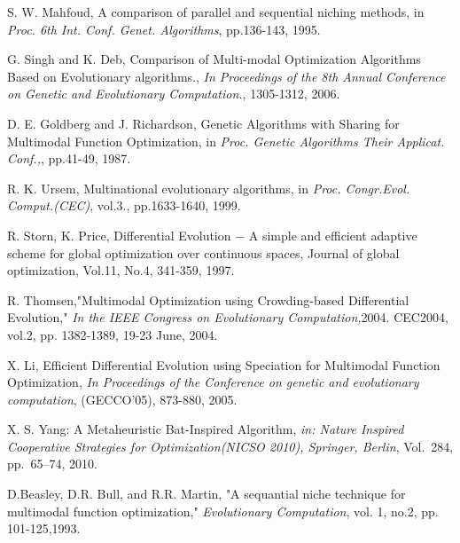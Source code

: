 \documentclass[conference]{IEEEtran}
\begin{document}
\begin{thebibliography}{00}
S. W. Mahfoud, A comparison of parallel and sequential niching methods, in \textit{Proc. 6th Int. Conf. Genet. Algorithms}, pp.136-143, 1995.


G. Singh and K. Deb, Comparison of Multi-modal Optimization Algorithms Based on Evolutionary algorithms., \textit{In Proceedings of the 8th Annual Conference on Genetic and Evolutionary Computation.}, 1305-1312, 2006.

D. E. Goldberg and J. Richardson, Genetic Algorithms with Sharing for Multimodal Function Optimization, in \textit{Proc. Genetic Algorithms Their Applicat. Conf.,}, pp.41-49, 1987.

R. K. Ursem, Multinational evolutionary algorithms, in \textit{Proc. Congr.Evol. Comput.(CEC)}, vol.3., pp.1633-1640, 1999.

R. Storn, K. Price, Differential Evolution − A simple and efficient adaptive scheme for global optimization over continuous spaces, Journal of global optimization, Vol.11, No.4, 341-359, 1997.

R. Thomsen,"Multimodal Optimization using Crowding-based Differential Evolution," {\it In the IEEE Congress on Evolutionary Computation,}2004. CEC2004, vol.2, pp. 1382-1389, 19-23 June, 2004.

X. Li, Efficient Differential Evolution using Speciation for Multimodal Function Optimization, \textit{In Proceedings of the Conference on genetic and evolutionary computation}, (GECCO'05), 873-880, 2005. 


X. S. Yang: A Metaheuristic Bat-Inspired Algorithm,
 \textit{in: Nature Inspired Cooperative Strategies for Optimization(NICSO 2010), Springer, Berlin}, Vol.~284, pp.~65--74, 2010.

 D.Beasley, D.R. Bull, and R.R. Martin, "A sequantial niche technique for multimodal function optimization," {\it Evolutionary Computation}, vol. 1, no.2, pp. 101-125,1993.


\end{thebibliography}
\end{document}
